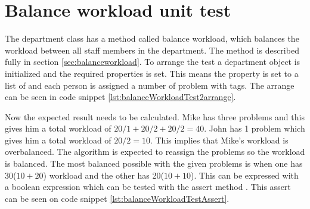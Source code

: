 \section{Balance workload unit test}
\label{sec:balWorUniTes}
The department class has a method called balance workload, which balances the workload between all staff members in the department. 
The method is described fully in section \ref{sec:balanceworkload}. 
To arrange the test a department object is initialized and the required properties is set. This means the  property is set to a list of  and each person is assigned a number of problem with tags. 
The arrange can be seen in code snippet \ref{lst:balanceWorkloadTest2arrange}. 
\begin{comment}

\begin{lstlisting}[style=sourceCode, caption=\myCaption{The arrange phase of the unit test of balance workload}, label=lst:balanceWorkloadTest2arrange]
[TestMethod()]
var tag1 =  new Tag(){ TimeConsumed = 20, SolvedProblems = 1 , Priority = 1  };  
var tag2 =  new Tag(){ TimeConsumed = 10, SolvedProblems = 1 , Priority = 2  }; 
var tag3 =  new Tag(){ TimeConsumed = 10, SolvedProblems = 1 , Priority = 3  };  //(TimeConsumed / SolvedProblems) = 10
var tag4 =  new Tag(){ TimeConsumed = 10, SolvedProblems = 1 , Priority = 4  };  //(TimeConsumed / SolvedProblems) = 10

var prob1 = new Problem() { Tags = new EntityCollection<Tag> { tag1 }, Reassignable = true };
var prob2 = new Problem() { Tags = new EntityCollection<Tag> { tag2 }, Reassignable = true };
var prob3 = new Problem() { Tags = new EntityCollection<Tag> { tag3 }, Reassignable = true };
var prob4 = new Problem() { Tags = new EntityCollection<Tag> { tag4 }, Reassignable = true };
   
var mike = new Person() { Name="mike", Worklist = new EntityCollection<Problem>() { prob1, prob2, prob3 } }; // Workload = 40
var john = new Person() { Name= "John", Worklist = new EntityCollection<Problem>() { prob4 } };               // = 10

Department target = new Department()
{
    Persons = new EntityCollection<Person>()
    {
        mike, john
    }
};
\end{lstlisting}
\end{comment}

Now the expected result needs to be calculated. 
Mike has three problems and this gives him a total workload of $20/1 + 20/2 + 20/2 = 40$. 
John has 1 problem which gives him a total workload of $20 / 2 = 10$. 
This implies that Mike's workload is overbalanced. 
The algorithm is expected to reassign the problems so the workload is balanced. 
The most balanced possible with the given problems is when one has 30($10 + 20$) workload and the other has 20($10 + 10$). 
This can be expressed with a boolean expression which can be tested with the assert method . 
This assert can be seen on code snippet \ref{lst:balanceWorkloadTestAssert}.

